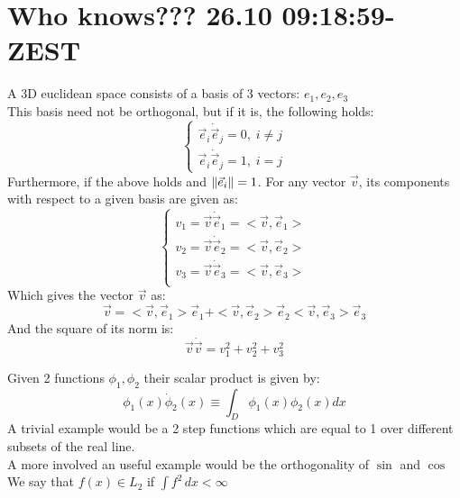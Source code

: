


\chapter{Who knows??? 26.10	09:18:59-ZEST}

{
    A 3D euclidean space consists of a basis of 3 vectors: $e_1, e_2, e_3$\\
    This basis need not be orthogonal, but if it is, the following holds:
    \begin{equation}
        \begin{cases}
        \vec{e}_i\dot\vec{e}_j = 0,\; i\neq j\\
        \vec{e}_i\dot\vec{e}_j = 1,\; i = j
        \end{cases}
    \end{equation}
    Furthermore, if the above holds and $\lVert\vec{e}_i\rVert = 1$.
    For any vector $\vec{v}$, its components with respect to a given basis are given as:
     \begin{equation}
        \begin{cases}
            v_1 = \vec{v}\dot\vec{e}_1 = <\vec{v},\vec{e}_1>\\
            v_2 = \vec{v}\dot\vec{e}_2 = <\vec{v},\vec{e}_2>\\
            v_3 = \vec{v}\dot\vec{e}_3 = <\vec{v},\vec{e}_3>\\
        \end{cases}
    \end{equation}
    Which gives the vector $\vec{v}$ as:
     \begin{equation}
         \vec{v} = <\vec{v},\vec{e}_1>\vec{e}_1 + <\vec{v},\vec{e}_2>\vec{e}_2  <\vec{v},\vec{e}_3>\vec{e}_3
    \end{equation}
    And the square of its norm is:
    \begin{equation}
        \vec{v}\dot\vec{v} = v_1^{2} + v_2^{2} + v_3^{2}
    \end{equation}
}

{
    Given 2 functions $\phi_1, \phi_2 $ their scalar product is given by:
    \begin{equation}
        \phi_1(x)\dot\phi_2(x) \equiv \int_D \phi_1(x) \phi_2(x)dx
    \end{equation}
    {
        A trivial example would be a 2 step functions which are equal to 1 over different subsets of the real line.\\
       A more involved an useful example would be the orthogonality of  $\sin$ and $\cos$
    }
}
{
    We say that $f(x) \in L_2$ if $\int f^{2}\,dx < \infty$
}


